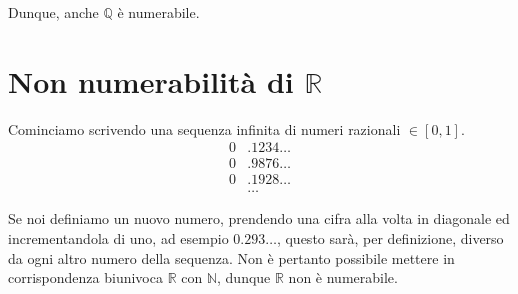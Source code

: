 \documentclass[../../analisi1]{subfiles}
\begin{document}
            Dunque, anche \(\mathbb{Q}\) è numerabile.

        \newpage

        \section*{Non numerabilità di \(\mathbb{R}\)}

            Cominciamo scrivendo una sequenza infinita di numeri razionali \(\in [0, 1]\).
            \begin{align*}
                0&.1234\dots\\
                0&.9876\dots\\
                0&.1928\dots\\
                &\dots
            \end{align*}

            Se noi definiamo un nuovo numero, prendendo una cifra alla volta in diagonale ed incrementandola di uno,
            ad esempio \(0.293\dots\), questo sarà, per definizione, diverso da ogni altro numero della sequenza.
            Non è pertanto possibile mettere in corrispondenza biunivoca \(\mathbb{R}\) con \(\mathbb{N}\), dunque \(\mathbb{R}\)
            non è numerabile.
\end{document}
